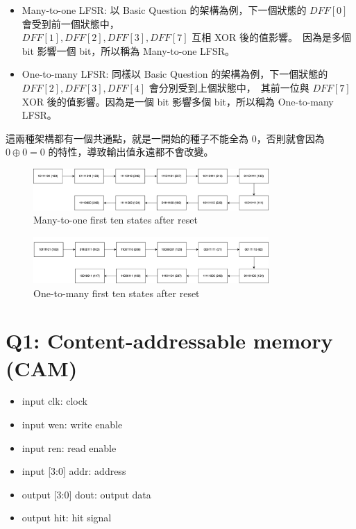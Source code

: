 \documentclass[10.5pt,compsoc,UTF8]{CjC}
\theoremstyle{mystyle}
\begin{document}
\begin{itemize}
  \item Many-to-one LFSR: 以 Basic Question 的架構為例，下一個狀態的 $DFF[0]$ 會受到前一個狀態中，\\
  $DFF[1], DFF[2], DFF[3], DFF[7]$ 互相 XOR 後的值影響。\
  因為是多個 bit 影響一個 bit，所以稱為 Many-to-one LFSR。
  \item One-to-many LFSR: 同樣以 Basic Question 的架構為例，下一個狀態的 $DFF[2], DFF[3], DFF[4]$ 會分別受到上個狀態中，\
  其前一位與 $DFF[7]$ XOR 後的值影響。因為是一個 bit 影響多個 bit，所以稱為 One-to-many LFSR。
\end{itemize}

這兩種架構都有一個共通點，就是一開始的種子不能全為 0，否則就會因為 $0 \oplus 0 = 0$ 的特性，導致輸出值永遠都不會改變。

\begin{figure}[h!]
  \centering
  \includegraphics[width=0.8\textwidth]{./img/Lab4-LFSR.png}
  \caption{Many-to-one first ten states after reset}
  \label{fig:LFSR-1}
\end{figure}

\begin{figure}[h!]
  \centering
  \includegraphics[width=0.8\textwidth]{./img/Lab4-LFSR-2.png}
  \caption{One-to-many first ten states after reset}
  \label{fig:LFSR-2}
\end{figure}

\section{Q1: Content-addressable memory (CAM)}

\begin{itemize}
  \item input clk: clock
  \item input wen: write enable
  \item input ren: read enable
  \item input [3:0] addr: address
  \item output [3:0] dout: output data
  \item output hit: hit signal
\end{itemize}
\end{document}
